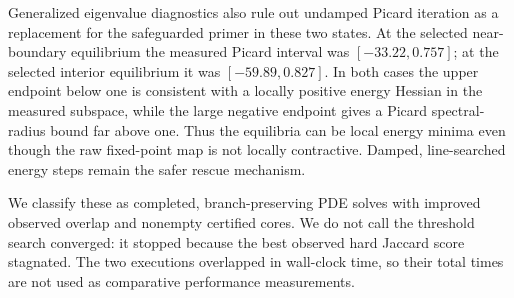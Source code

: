 Generalized eigenvalue diagnostics also rule out undamped Picard iteration as
a replacement for the safeguarded primer in these two states.  At the
selected near-boundary equilibrium the measured Picard interval was
$[-33.22,0.757]$; at the selected interior equilibrium it was
$[-59.89,0.827]$.  In both cases the upper endpoint below one is consistent
with a locally positive energy Hessian in the measured subspace, while the
large negative endpoint gives a Picard spectral-radius bound far above one.
Thus the equilibria can be local energy minima even though the raw fixed-point
map is not locally contractive.  Damped, line-searched energy steps remain the
safer rescue mechanism.

We classify these as completed, branch-preserving PDE solves with improved
observed overlap and nonempty certified cores.  We do not call the threshold
search converged: it stopped because the best observed hard Jaccard score
stagnated.  The two executions overlapped in wall-clock time, so their total
times are not used as comparative performance measurements.
